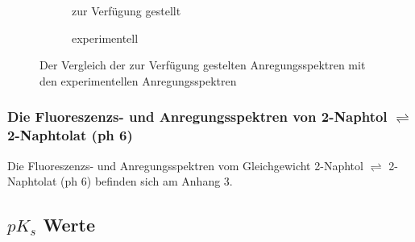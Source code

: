 \documentclass[12pt]{article}
\newcommand\addplotzr{\directlua{drawZZ()}}
\begin{document}


\begin{figure}[!htbp]
  \begin{subfigure}{.45\textwidth}
    \caption{zur Verfügung gestellt}
  \end{subfigure}%
  \begin{subfigure}{.45\textwidth}
    \resizebox{\linewidth}{!}{
      \begin{tikzpicture}
        \begin{axis}[standard]
          \addplotzr
        \end{axis}
      \end{tikzpicture}}
    \caption{experimentell}
  \end{subfigure}
  \caption{Der Vergleich der zur Verfügung gestelten Anregungsspektren mit den experimentellen Anregungsspektren}

\end{figure}






\subsubsection{Die Fluoreszenzs- und Anregungsspektren von 2-Naphtol $\rightleftharpoons$ 2-Naphtolat (ph 6)}
Die Fluoreszenzs- und Anregungsspektren vom Gleichgewicht 2-Naphtol $\rightleftharpoons$ 2-Naphtolat (ph 6) befinden sich am Anhang 3.

\subsection{$pK_s$ Werte}
\end{document}
